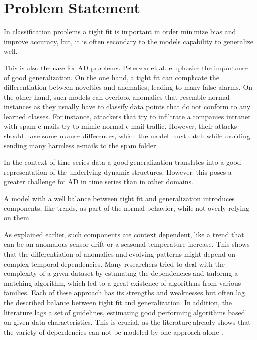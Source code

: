 

\section{Problem Statement}
In classification problems a tight fit is important in order minimize bias and improve accuracy, but, it is often secondary to the models capability to generalize well. 

This is also the case for AD problems. Peterson et al. \cite{Peterson2007} emphasize the importance of good generalization. On the one hand, a tight fit can complicate the differentiation between novelties and anomalies, leading to many false alarms. On the other hand, such models can overlook anomalies that resemble normal instances as they usually have to classify data points that do not conform to any learned classes. For instance, attackers that try to infiltrate a companies intranet with spam e-mails try to mimic normal e-mail traffic. However, their attacks should have some nuance differences, which the model must catch while avoiding sending many harmless e-mails to the spam folder.

In the context of time series data a good generalization translates into a good representation of the underlying dynamic structures. However, this poses a greater challenge for AD in time series than in other domains.

A model with a well balance between tight fit and generalization introduces components, like trends, as part of the normal behavior, while not overly relying on them.

As explained earlier, such components are context dependent, like a trend that can be an anomalous sensor drift or a seasonal temperature increase. This shows that the differentiation of anomalies and evolving patterns might depend on complex temporal dependencies. Many researchers tried to deal with the complexity of a given dataset by estimating the dependencies and tailoring a matching algorithm, which led to a great existence of algorithms from various families. Each of these approach has its strengths and weaknesses but often lag the described balance between tight fit and generalization. In addition, the literature lags a set of guidelines, estimating good performing algorithms based on given data characteristics. This is crucial, as the literature already shows that the variety of dependencies can not be modeled by one approach alone \cite{Schmidl2022}.   
   
